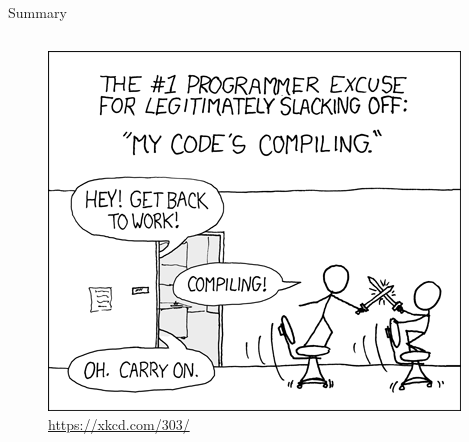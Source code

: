 \documentclass[@BEAMER_OPTIONS@]{beamer}
\newcommand{\www}[1]{\href{#1}{#1}}
\begin{document}
\begin{frame}[fragile]{Summary}
\begin{columns}
\begin{column}{0.3\textwidth}
\begin{uncoverenv}
\begin{figure}
                    \includegraphics[width=\textwidth]{compiling.png}
                    \caption{\tiny \www{https://xkcd.com/303/}}
                \end{figure}
            \end{uncoverenv}
        \end{column}
    \end{columns}
\end{frame}
\end{document}
